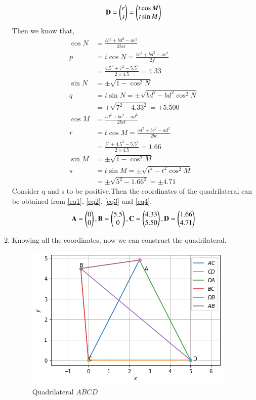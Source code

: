 \documentclass[journal,12pt,twocolumn]{IEEEtran}
\begin{document}
\begin{enumerate}
\begin{equation}
    \mathbf{D}=\begin{pmatrix}r\\s\end{pmatrix}=\begin{pmatrix}t\cos M\\t\sin M\end{pmatrix} \label{eq4}
\end{equation}
Then we know that,
\begin{align}
  \cos N&=\frac{bc^2+bd^2-ac^2}{2bci}\\
    p&=i\cos N=\frac{bc^2+bd^2-ac^2}{2f}\\
    &=\frac{4.5^2+7^2-5.5^2}{2\times 4.5}=4.33\\
   \sin N&=\pm\sqrt{1-\cos^2 N}\\
   q&=i\sin N=\pm\sqrt{bd^2-bd^2\cos^2 N}\\
   &=\pm\sqrt{7^2-4.33^2}=\pm5.500\\
   \cos M&=\frac{cd^2+bc^2-ad^2}{2bct}\\
  r&= t\cos M=\frac{cd^2+bc^2-ad^2}{2bc}\\
    &=\frac{5^2+4.5^2-5.5^2}{2\times 4.5}=1.66\\
     \sin M&=\pm\sqrt{1-\cos^2 M}\\
  s&= t\sin M=\pm\sqrt{t^2-t^2\cos^2 M}\\
   &=\pm\sqrt{5^2-1.66^2}=\pm4.71
\end{align}
Consider q and s to be positive.Then the coordinates of the quadrilateral can be obtained from \ref{eq1}, \ref{eq2}, \ref{eq3} and \ref{eq4}.
\begin{equation}
\mathbf{A}=\begin{pmatrix}0\\0\end{pmatrix},\mathbf{B}=\begin{pmatrix}5.5\\0\end{pmatrix},\mathbf{C}=\begin{pmatrix}4.33\\5.50\end{pmatrix},\mathbf{D}=\begin{pmatrix}1.66\\4.71\end{pmatrix}
\end{equation}
\item Knowing all the coordinates, now we can construct the quadrilateral.
\begin{figure}[!ht]
\centering
    \includegraphics[width= \columnwidth]{quad.png}
    \caption{Quadrilateral $ABCD$}
\end{figure}
\end{enumerate}
\end{document}
